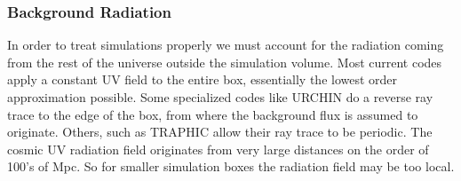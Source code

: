 \documentclass[fleq,usenatbib]{mnras}
\begin{document}
{\subsubsection{Background Radiation}
In order to treat simulations properly we must account for the radiation 
coming from the rest of the universe outside the simulation volume. Most 
current codes apply a constant UV field to the entire box, essentially the 
lowest order approximation possible. Some specialized codes like URCHIN 
\citep{altayTheuns13} do a reverse ray trace to the edge of the box, from 
where the background flux is assumed to originate. Others, such as TRAPHIC 
\citep{pawlikSchaye08} allow their ray trace to be periodic.
The cosmic UV radiation field 
originates from very large distances on the order of 100's of Mpc.  So for smaller
simulation boxes the radiation field may be too local.

}
\end{document}

